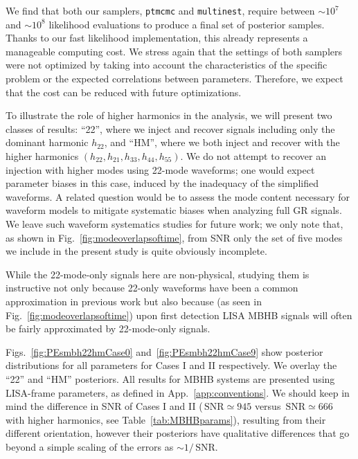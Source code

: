\documentclass[aps,showpacs,twocolumn,prd,superscriptaddress,nofootinbib]{revtex4-1}
\newcommand{\SNR}{\,\mathrm{SNR}}
\begin{document}
We find that both our samplers, \texttt{ptmcmc} and \texttt{multinest}, require between $\sim 10^{7}$ and $\sim 10^{8}$ likelihood evaluations to produce a final set of posterior samples.
Thanks to our fast likelihood implementation, this already represents a manageable computing cost.
We stress again that the settings of both samplers were not optimized by taking into account the characteristics of the specific problem or the expected correlations between parameters.
Therefore, we expect that the cost can be reduced with future optimizations.

To illustrate the role of higher harmonics in the analysis, we will present two classes of results: ``22'', where we inject and recover signals including only the dominant harmonic $h_{22}$, and ``HM'', where we both inject and recover with the higher harmonics $(h_{22}, h_{21}, h_{33}, h_{44}, h_{55})$. We do not attempt to recover an injection with higher modes using 22-mode waveforms; one would expect parameter biases in this case, induced by the inadequacy of the simplified waveforms. A related question would be to assess the mode content necessary for waveform models to mitigate systematic biases when analyzing full GR signals. We leave such waveform systematics studies for future work; we only note that, as shown in Fig.~\ref{fig:modeoverlapsoftime}, from SNR only the set of five modes we include in the present study is quite obviously incomplete.

While the 22-mode-only signals here are non-physical, studying them is instructive not only because  22-only waveforms have been a common approximation in previous work but also because (as seen in Fig.~\ref{fig:modeoverlapsoftime}) upon first detection LISA MBHB signals will often be fairly approximated by 22-mode-only signals.

Figs.~\ref{fig:PEsmbh22hmCase0} and~\ref{fig:PEsmbh22hmCase9} show posterior distributions for all parameters for Cases I and II respectively.
We overlay the ``22'' and ``HM'' posteriors.
All results for MBHB systems are presented using LISA-frame parameters, as defined in App.~\ref{app:conventions}. We should keep in mind the difference in SNR of Cases I and II ($\SNR \simeq 945$ versus $\SNR \simeq 666$ with higher harmonics, see Table~\ref{tab:MBHBparams}), resulting from their different orientation, however their posteriors have qualitative differences that go beyond a simple scaling of the errors as $\sim 1/\SNR$.
\end{document}
